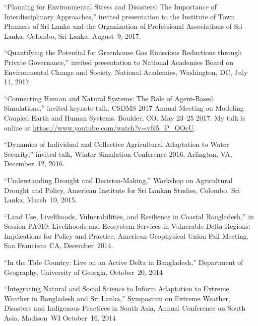 \item ``Planning for Environmental Stress and Disasters: The Importance of
  Interdisciplinary Approaches,'' invited presentation to the Institute of Town
  Planners of Sri Lanka and the Organization of Professional Associations of
  Sri Lanka. Colombo, Sri Lanka, August~9, 2017.
\item ``Quantifying the Potential for Greenhouse Gas Emissions Reductions
  through Private Governance,'' invited presentation to National Academies
  Board on Environmental Change and Society. National Academies, Washington,
  DC, July 11, 2017.
\item  ``Connecting Human and Natural Systems: The Role of Agent-Based
  Simulations,'' invited keynote talk, CSDMS 2017 Annual Meeting on Modeling
  Coupled Earth and Human Systems. Boulder, CO. May 23--25 2017.
  My talk is online at
  \url{https://www.youtube.com/watch?v=v6i5_P_OOcU}.
\item  ``Dynamics of Individual and Collective Agricultural Adaptation to Water
  Security,'' invited talk, Winter Simulation Conference 2016, Arlington, VA,
  December~12, 2016.
\item ``Understanding Drought and Decision-Making,'' Workshop on Agricultural
  Drought and Policy, American Institute for Sri Lankan Studies, Colombo, Sri
  Lanka, March~10, 2015.
\item ``Land Use, Livelihoods, Vulnerabilities, and Resilience in Coastal
  Bangladesh,'' in Session PA010: Livelihoods and Ecosystem Services in
  Vulnerable Delta Regions: Implications for Policy and Practice, American
  Geophysical Union Fall Meeting, San Francisco~CA, December~2014.
\item ``In the Tide Country: Live on an Active Delta in Bangladesh,''
  Department of Geography, University of Georgia, October~20, 2014
\item ``Integrating Natural and Social Science to Inform Adaptation to Extreme
  Weather in Bangladesh and Sri Lanka,'' Symposium on Extreme Weather,
  Disasters and Indigenous Practices in South Asia, Annual Conference on South
  Asia, Madison~WI October~16, 2014
